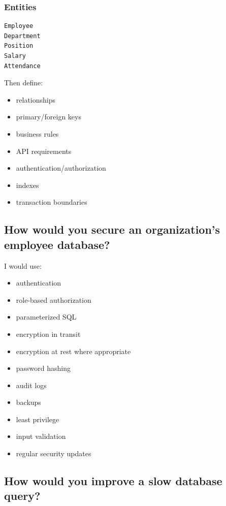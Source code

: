 \subsubsection{Entities}

\begin{lstlisting}
Employee
Department
Position
Salary
Attendance
\end{lstlisting}

Then define:

\begin{itemize}
  \item relationships
  \item primary/foreign keys
  \item business rules
  \item API requirements
  \item authentication/authorization
  \item indexes
  \item transaction boundaries
\end{itemize}

\medskip

\subsection{How would you secure an organization's employee database?}

I would use:

\begin{itemize}
  \item authentication
  \item role-based authorization
  \item parameterized SQL
  \item encryption in transit
  \item encryption at rest where appropriate
  \item password hashing
  \item audit logs
  \item backups
  \item least privilege
  \item input validation
  \item regular security updates
\end{itemize}

\medskip

\subsection{How would you improve a slow database query?}

